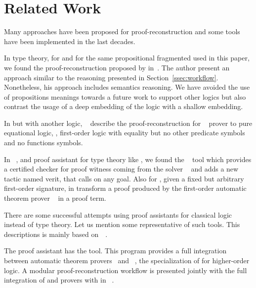 \documentclass[../main.tex]{subfiles}
\begin{document}

\section{Related Work}
\label{sec:related-work}

Many approaches have been proposed for proof-reconstruction and some tools have been implemented in the last decades.

In type theory, for \Agda and  for the same propositional fragmented used in this paper,
we found the proof-reconstruction proposed by \citeauthor{Kanso2012}
in~\cite{Kanso2012,kanso2016light}. The author present an approach similar to
the reasoning presented in Section~\ref{ssec:workflow}.
Nonetheless, his approach includes semantics reasoning. We have avoided the
use of propositions meanings towards a future work to support other logics but
also contrast the usage of a deep embedding of the logic with a shallow
embedding.

In \Agda but with another logic, \citeauthor{foster2011integrating}~\cite{foster2011integrating}
describe the proof-reconstruction for ~\cite{hillenbrand1997}
prover to pure equational logic, \ie,
first-order logic with equality but no other predicate symbols and no
functions symbols.

In ~\cite{coqteam}, and proof assistant for type theory like \Agda,
we found the ~\cite{armand2011,Ekici2017} tool which provides a
certified checker for proof witness coming from the \SMT solver
~\cite{bouton2009} and adds a new tactic named verit,
that calls  on any  goal.
Also for ,
given a fixed but arbitrary first-order signature,
\citeauthor{Bezem2002} in \cite{Bezem2002}
transform a proof produced by the first-order automatic theorem
prover ~\cite{deNivelle2003} in a  proof
term.

There are some successful attempts using proof assistants for classical logic
instead of type theory.
Let us mention some representative of such tools. This descriptions is
mainly based on~\citeauthor{Sicard-Ramirez2016}~\cite{Sicard-Ramirez2016}.

The  proof assistant has the  tool.
This program provides a full integration between
automatic theorem provers~\cite{blanchette2013extending,Fleury2014,bohme2010} and
~\cite{nipkow2002isabelle}, the specialization of
 for higher-order logic.
A modular proof-reconstruction workflow is presented jointly with
the full integration of  and  provers with
 in \citeauthor{Een2004}~\cite{Een2004}.
\end{document}
